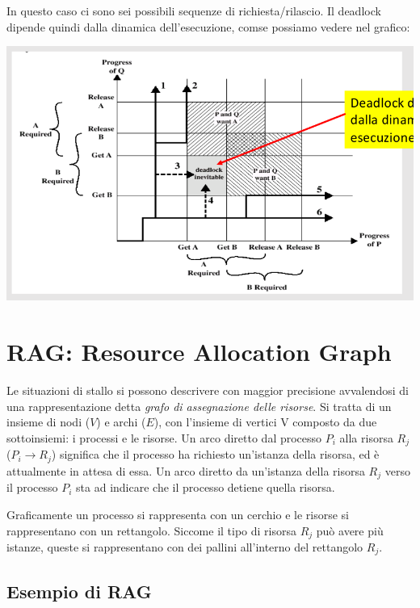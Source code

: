 \documentclass[a4paper,12pt, twoside]{report}
\begin{document}
In questo caso ci sono sei possibili sequenze di richiesta/rilascio. Il deadlock dipende quindi dalla dinamica dell'esecuzione,
comse possiamo vedere nel grafico:

\begin{center}
\includegraphics[scale=0.35] {graf}
\end{center}

\section{RAG: Resource Allocation Graph}

Le situazioni di stallo si possono descrivere con maggior precisione avvalendosi di una rappresentazione detta \emph{grafo
di assegnazione delle risorse}. Si tratta di un insieme di nodi ($V$) e archi ($E$), con l'insieme di vertici V composto
da due sottoinsiemi: i processi e le risorse. Un arco diretto dal processo $P_i$ alla risorsa $R_j$ ($P_i \to R_j$) significa
che il processo ha richiesto un'istanza della risorsa, ed \`e attualmente in attesa di essa. Un arco diretto da un'istanza
della risorsa $R_j$ verso il processo $P_i$ sta ad indicare che il processo detiene quella risorsa.

Graficamente un processo si rappresenta con un cerchio e le risorse si rappresentano con un rettangolo. Siccome il tipo
di risorsa $R_j$ pu\`o avere pi\`u istanze, queste si rappresentano con dei pallini all'interno del rettangolo $R_j$.

\subsection{Esempio di RAG}
\end{document}
